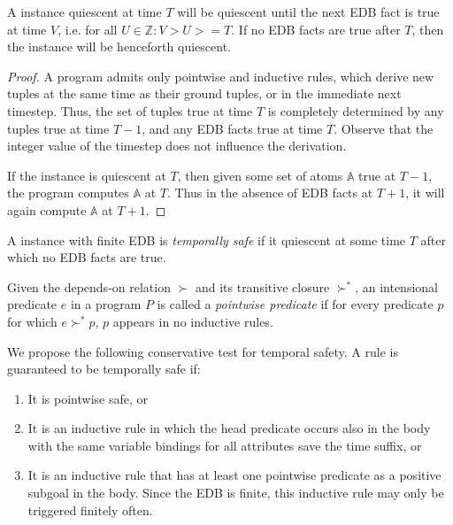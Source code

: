 \begin{observation}
%
A \slang instance quiescent at time $T$ will be quiescent until the next EDB
fact is true at time $V$, i.e. for all $U \in \mathbb{Z}: V > U >= T$.  If no
EDB facts are true after $T$, then the instance will be henceforth quiescent.
%
\end{observation}
%
\begin{proof}
%
A \slang program admits only pointwise and inductive rules, which derive new
tuples at the same time as their ground tuples, or in the immediate next
timestep.  Thus, the set of tuples true at time $T$ is completely determined by
any tuples true at time $T-1$, and any EDB facts true at time $T$.  Observe
that the integer value of the timestep does not influence the derivation.

If the instance is quiescent at $T$, then given some set of atoms $\mathbb{A}$
true at $T-1$, the program computes $\mathbb{A}$ at $T$.  Thus in the absence
of EDB facts at $T+1$, it will again compute $\mathbb{A}$ at $T+1$.
%
\end{proof}

\begin{definition}
%
A \slang instance with finite EDB is \emph{temporally safe} if it quiescent at
some time $T$ after which no EDB facts are true.
%
\end{definition}

\begin{definition}
%
Given the depends-on relation $\succ$ and its transitive closure $\succ^{*}$,
an intensional predicate $e$ in a program $P$ is called a \emph{pointwise
predicate} if for every predicate $p$ for which $e \succ^{*} p$, $p$ appears in
no inductive rules.
%
\end{definition}

We propose the following conservative test for temporal safety.  A rule is
guaranteed to be temporally safe if:

\begin{enumerate}
%
\item It is pointwise safe, or
%
\item It is an inductive rule in which the head predicate occurs also in the
body with the same variable bindings for all attributes save the time suffix,
or
%
\item It is an inductive rule that has at least one pointwise predicate as a
positive subgoal in the body.  Since the EDB is finite, this inductive rule
may only be triggered finitely often.
%
\end{enumerate}

